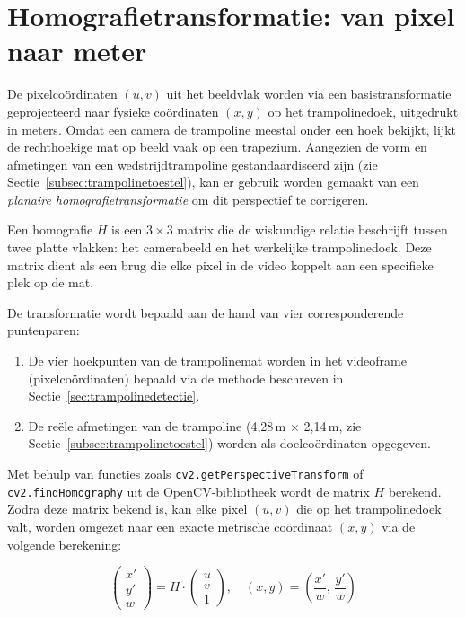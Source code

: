 
\section{Homografietransformatie: van pixel naar meter}
\label{sec:homografie}

De pixelco{\"o}rdinaten $(u, v)$ uit het beeldvlak worden via een basistransformatie geprojecteerd naar fysieke co{\"o}rdinaten $(x, y)$ op het trampolinedoek, uitgedrukt in meters. Omdat een camera de trampoline meestal onder een hoek bekijkt, lijkt de rechthoekige mat op beeld vaak op een trapezium. Aangezien de vorm en afmetingen van een wedstrijdtrampoline gestandaardiseerd zijn (zie Sectie~\ref{subsec:trampolinetoestel}), kan er gebruik worden gemaakt van een \textit{planaire homografietransformatie} om dit perspectief te corrigeren.

Een homografie $H$ is een $3 \times 3$ matrix die de wiskundige relatie beschrijft tussen twee platte vlakken: het camerabeeld en het werkelijke trampolinedoek. Deze matrix dient als een brug die elke pixel in de video koppelt aan een specifieke plek op de mat.

De transformatie wordt bepaald aan de hand van vier corresponderende puntenparen:
\begin{enumerate}
    \item De vier hoekpunten van de trampolinemat worden in het videoframe (pixelco{\"o}rdinaten) bepaald via de methode beschreven in Sectie~\ref{sec:trampolinedetectie}.
    \item De re{\"e}le afmetingen van de trampoline (4,28\,m $\times$ 2,14\,m, zie Sectie~\ref{subsec:trampolinetoestel}) worden als doelco{\"o}rdinaten opgegeven.
\end{enumerate}

Met behulp van functies zoals \texttt{cv2.getPerspectiveTransform} of \texttt{cv2.findHomography} uit de OpenCV-bibliotheek wordt de matrix $H$ berekend. Zodra deze matrix bekend is, kan elke pixel $(u, v)$ die op het trampolinedoek valt, worden omgezet naar een exacte metrische coördinaat $(x, y)$ via de volgende berekening:

\[
    \begin{pmatrix} x' \\ y' \\ w \end{pmatrix} = H \cdot \begin{pmatrix} u \\ v \\ 1 \end{pmatrix}, \quad (x, y) = \left(\frac{x'}{w},\, \frac{y'}{w}\right)
\]

